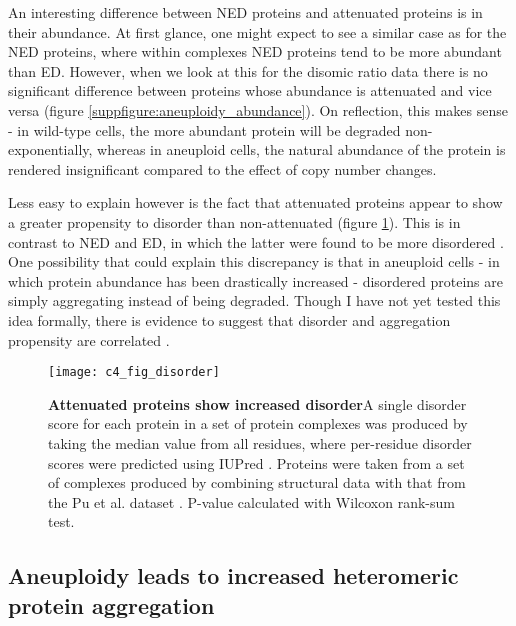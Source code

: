 \documentclass[a4paper,11pt,twoside,openright]{scrbook}
\begin{document}
An interesting difference between NED proteins and attenuated proteins is in their abundance. At first glance, one might expect to see a similar case as for the NED proteins, where within complexes NED proteins tend to be more abundant than ED. However, when we look at this for the disomic ratio data there is no significant difference between proteins whose abundance is attenuated and vice versa (figure \ref{suppfigure:aneuploidy_abundance}). On reflection, this makes sense - in wild-type cells, the more abundant protein will be degraded non-exponentially, whereas in aneuploid cells, the natural abundance of the protein is rendered insignificant compared to the effect of copy number changes.

Less easy to explain however is the fact that attenuated proteins appear to show a greater propensity to disorder than non-attenuated (figure \ref{figure:aneuploidy_disorder}). This is in contrast to NED and ED, in which the latter were found to be more disordered \cite{McShane2016}. One possibility that could explain this discrepancy is that in aneuploid cells - in which protein abundance has been drastically increased - disordered proteins are simply aggregating instead of being degraded. Though I have not yet tested this idea formally, there is evidence to suggest that disorder and aggregation propensity are correlated \cite{Carvalho2013}.

\begin{figure}[h]
\fcapsideright
    {\caption[Attenuated proteins show increased disorder]{\sffamily\textbf{Attenuated proteins show increased disorder}\newline \small A single disorder score for each protein in a set of protein complexes was produced by taking the median value from all residues, where per-residue disorder scores were predicted using IUPred \cite{Dosztanyi2005}. Proteins were taken from a set of complexes produced by combining structural data with that from the Pu et al. dataset \cite{Pu2009}. P-value calculated with Wilcoxon rank-sum test.}\label{figure:aneuploidy_disorder}}
    {\texttt{[image: c4\_fig\_disorder]}}
\end{figure}

\subsection{Aneuploidy leads to increased heteromeric protein aggregation}
\end{document}
